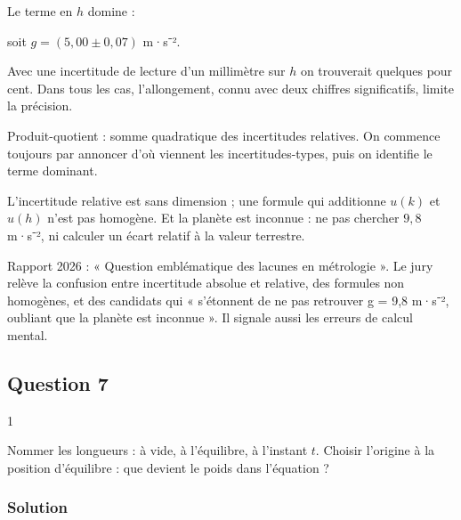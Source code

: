 \documentclass[11pt,a4paper]{article}
\newcommand{\equationajustee}[1]{%
  \sbox{\boiteequation}{$\displaystyle #1$}%
  \ifdim\wd\boiteequation>\linewidth
    \[\resizebox{\linewidth}{!}{\usebox{\boiteequation}}\]%
  \else
    \[#1\]%
  \fi}
\begin{document}
Le terme en \(h\) domine :

\equationajustee{\boxed{\frac{u(g)}{g}\simeq1{,}4\cdot10^{-2}}}

soit \(g=(5{,}00\pm0{,}07)\) m·s⁻².

Avec une incertitude de lecture d'un millimètre sur \(h\) on trouverait quelques pour cent. Dans tous les cas, l'allongement, connu avec deux chiffres significatifs, limite la précision.

\begin{methode}

Produit-quotient : somme quadratique des incertitudes relatives. On commence toujours par annoncer d'où viennent les incertitudes-types, puis on identifie le terme dominant.

\end{methode}

\begin{piege}

L'incertitude relative est sans dimension ; une formule qui additionne \(u(k)\) et \(u(h)\) n'est pas homogène. Et la planète est inconnue : ne pas chercher \(9{,}8\) m·s⁻², ni calculer un écart relatif à la valeur terrestre.

\end{piege}

\begin{jury}

Rapport 2026 : « Question emblématique des lacunes en métrologie ». Le jury relève la confusion entre incertitude absolue et relative, des formules non homogènes, et des candidats qui « s'étonnent de ne pas retrouver g = 9,8 m·s⁻², oubliant que la planète est inconnue ». Il signale aussi les erreurs de calcul mental.

\end{jury}

\hypertarget{question-7}{%
\subsection{Question 7}\label{question-7}}

\begin{indication}{1}

Nommer les longueurs : à vide, à l'équilibre, à l'instant \(t\). Choisir l'origine à la position d'équilibre : que devient le poids dans l'équation ?

\end{indication}

\hypertarget{solution-6}{%
\subsubsection{Solution}\label{solution-6}}
\end{document}
